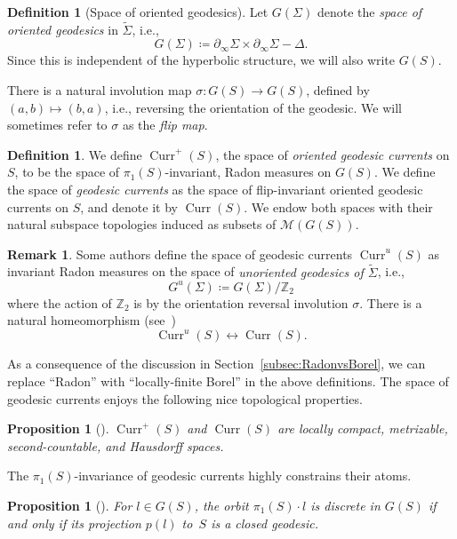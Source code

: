 \documentclass[11pt]{amsart}
\numberwithin{equation}{section}
\numberwithin{figure}{section}
\newtheorem{proposition}[theorem]{Proposition}
\theoremstyle{definition}
\newtheorem{remark}[theorem]{Remark}
\newtheorem{definition}[theorem]{Definition}
\theoremstyle{plain}
\DeclareMathOperator{\Curr}{Curr}
\newcommand*{\wt}[1]{\widetilde{#1}}
\begin{document}
\begin{definition}[Space of oriented geodesics]

\label{def:spacegeodesics}
Let $G(\Sigma)$ denote the \emph{space of oriented geodesics} in
$\wt{\Sigma}$, i.e.,
\[
G(\Sigma) \coloneqq\partial_\infty \Sigma  \times\partial_\infty\Sigma - \Delta.
\]
Since this is independent of the hyperbolic structure, we will also
write $G(S)$.
\end{definition}

There is a natural involution map $\sigma \colon G(S) \to G(S)$, defined by $(a,b) \mapsto (b,a)$, i.e., reversing the orientation of the geodesic. We will sometimes refer to $\sigma$ as the \emph{flip map}.

\begin{definition}\label{def:currents}
We define $\Curr^+(S)$, the space of \emph{oriented geodesic currents} on $S$,
to be the
space of $\pi_1(S)$-invariant, Radon measures on
$G(S)$.
We define the space of 
\emph{geodesic currents} as the space of flip-invariant oriented
geodesic currents on $S$, and denote it by $\Curr(S)$. We endow both
spaces with their natural subspace topologies induced as subsets of
$\mathcal{M}(G(S))$.%

\begin{remark}
\label{rmk:unoriented_currents}
Some authors define the space of geodesic currents $\Curr^u(S)$ as invariant Radon measures on the space of \emph{unoriented geodesics of $\wt{\Sigma}$}, i.e., 
\[
G^u(\Sigma) \coloneqq G(\Sigma)/\mathbb{Z}_2
\]
where the action of $\mathbb{Z}_2$ is by the orientation reversal involution $\sigma$.
There is a natural homeomorphism (see~\cite[Exercise~3.1]{ES22:GeodesicCount})
\[
\Curr^u(S) \leftrightarrow \Curr(S).
\]
\end{remark}
\end{definition}

As a consequence of the discussion in
Section~\ref{subsec:RadonvsBorel}, we can replace ``Radon'' with
``locally-finite Borel'' in the above definitions.
The space of geodesic currents enjoys the following nice topological properties.

\begin{proposition}[{\cite[Theorem~3.3]{ES22:GeodesicCount}}]
$\Curr^+(S)$ and $\Curr(S)$  are locally compact, metrizable, second-countable, and Hausdorff spaces.
\label{prop:local_compactness}
\end{proposition}

The $\pi_1(S)$-invariance of geodesic currents highly constrains their atoms.
\begin{proposition}[{\cite[Lemma~8.2.8]{Martelli16:IntroGeoTop}}]
  For $l \in G(S)$, the orbit $\pi_1(S)\cdot l$ is
  discrete in $G(S)$ if and only if its projection $p(l)$ to~$S$ is a closed
  geodesic.
\end{proposition}
\end{document}

